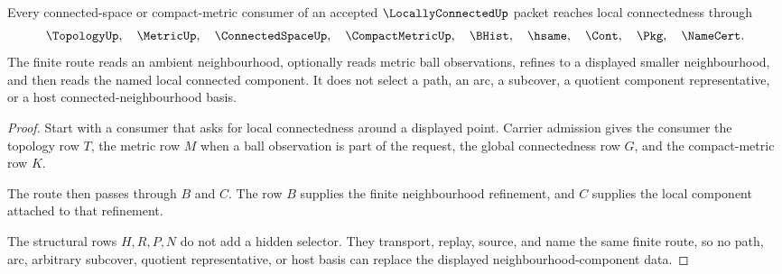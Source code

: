 \begin{theorem}
\label{thm:locally-connected-neighborhood-component-route}
Every connected-space or compact-metric consumer of an accepted $\LocallyConnectedUp$ packet reaches local connectedness through
$$
\TopologyUp,\quad \MetricUp,\quad \ConnectedSpaceUp,\quad \CompactMetricUp,\quad \BHist,\quad \hsame,\quad \Cont,\quad \Pkg,\quad \NameCert .
$$
The finite route reads an ambient neighbourhood, optionally reads metric ball observations, refines to a displayed smaller neighbourhood, and then reads the named local connected component. It does not select a path, an arc, a subcover, a quotient component representative, or a host connected-neighbourhood basis.
\end{theorem}
\begin{proof}
Start with a consumer that asks for local connectedness around a displayed point. Carrier admission gives the consumer the topology row $T$, the metric row $M$ when a ball observation is part of the request, the global connectedness row $G$, and the compact-metric row $K$.

The route then passes through $B$ and $C$. The row $B$ supplies the finite neighbourhood refinement, and $C$ supplies the local component attached to that refinement.

The structural rows $H,R,P,N$ do not add a hidden selector. They transport, replay, source, and name the same finite route, so no path, arc, arbitrary subcover, quotient representative, or host basis can replace the displayed neighbourhood-component data.
\end{proof}

